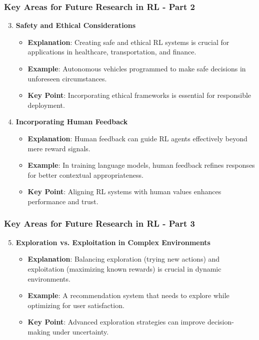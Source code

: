 \documentclass[aspectratio=169]{beamer}
\begin{document}
\begin{frame}[fragile]
    \frametitle{Key Areas for Future Research in RL - Part 2}
    \begin{enumerate}
        \setcounter{enumi}{2} %
        \item \textbf{Safety and Ethical Considerations}
        \begin{itemize}
            \item \textbf{Explanation}: Creating safe and ethical RL systems is crucial for applications in healthcare, transportation, and finance.
            \item \textbf{Example}: Autonomous vehicles programmed to make safe decisions in unforeseen circumstances.
            \item \textbf{Key Point}: Incorporating ethical frameworks is essential for responsible deployment.
        \end{itemize}

        \item \textbf{Incorporating Human Feedback}
        \begin{itemize}
            \item \textbf{Explanation}: Human feedback can guide RL agents effectively beyond mere reward signals.
            \item \textbf{Example}: In training language models, human feedback refines responses for better contextual appropriateness.
            \item \textbf{Key Point}: Aligning RL systems with human values enhances performance and trust.
        \end{itemize}
    \end{enumerate}
\end{frame}

\begin{frame}[fragile]
    \frametitle{Key Areas for Future Research in RL - Part 3}
    \begin{enumerate}
        \setcounter{enumi}{4} %
        \item \textbf{Exploration vs. Exploitation in Complex Environments}
        \begin{itemize}
            \item \textbf{Explanation}: Balancing exploration (trying new actions) and exploitation (maximizing known rewards) is crucial in dynamic environments.
            \item \textbf{Example}: A recommendation system that needs to explore while optimizing for user satisfaction.
            \item \textbf{Key Point}: Advanced exploration strategies can improve decision-making under uncertainty.
        \end{itemize}
    \end{enumerate}
\end{frame}
\end{document}

